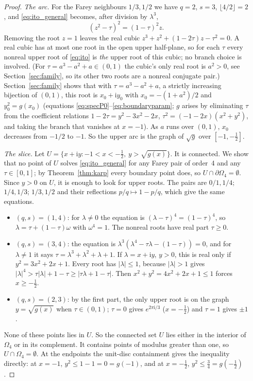 \documentclass[11pt,a4paper]{article}
\numberwithin{equation}{section}
\theoremstyle{definition}
\theoremstyle{remark}
\newcommand{\ii}{\mathrm{i}}
\newcommand{\Om}{\Omega}
\begin{document}
\begin{proof}
\emph{The arc.} For the Farey neighbours \(1/3,1/2\) we have
\(q=2\), \(s=3\), \(\lfloor4/2\rfloor=2\), and \eqref{eq:ito_general}
becomes, after division by \(\lambda^3\),
\begin{equation}
(z^2-\tau)^2=(1-\tau)^2z .
\label{eq:ito}
\end{equation}
Removing the root \(z=1\) leaves the real cubic
\(z^3+z^2+(1-2\tau)z-\tau^2=0\). A real cubic has at most one root in
the open upper half-plane, so for each \(\tau\) every nonreal upper
root of \eqref{eq:ito} is \emph{the} upper root of this cubic; no
branch choice is involved. (For \(\tau=a^3-a^2+a\in(0,1)\) the cubic's
only real root is \(a^2>0\), see Section~\ref{sec:family}, so its other
two roots are a nonreal conjugate pair.) Section~\ref{sec:family} shows that with
\(\tau=a^3-a^2+a\), a strictly increasing bijection of \((0,1)\), this
root is \(x_0+\ii y_0\) with \(x_0=-(1+a^2)/2\) and
\(y_0^2=g(x_0)\) (equations \eqref{eq:specP0}--\eqref{eq:boundaryparam};
\(g\) arises by eliminating \(\tau\) from the coefficient relations
\(1-2\tau=y^2-3x^2-2x\), \(\tau^2=(-1-2x)(x^2+y^2)\), and taking the
branch that vanishes at \(x=-1\)). As \(a\) runs over \((0,1)\), \(x_0\)
decreases from \(-1/2\) to \(-1\). So the upper arc is the graph of
\(\sqrt g\) over \([-1,-\frac12]\).

\emph{The slice.} Let \(U=\{x+\ii y:-1<x<-\frac12,\ y>\sqrt{g(x)}\}\).
It is connected. We show that no point of \(U\) solves
\eqref{eq:ito_general} for any Farey pair of order~4 and any
\(\tau\in[0,1]\); by Theorem~\ref{thm:karp} every boundary point does,
so \(U\cap\partial\Om_4=\emptyset\). Since \(y>0\) on \(U\), it is
enough to look for upper roots. The pairs are \(0/1,1/4\);
\(1/4,1/3\); \(1/3,1/2\) and their reflections \(p/q\mapsto1-p/q\),
which give the same equations.
\begin{itemize}
\item \((q,s)=(1,4)\): for \(\lambda\ne0\) the equation is
\((\lambda-\tau)^4=(1-\tau)^4\), so
\(\lambda=\tau+(1-\tau)\omega\) with \(\omega^4=1\). The nonreal roots
have real part \(\tau\ge0\).
\item \((q,s)=(3,4)\): the equation is
\(\lambda^3(\lambda^4-\tau\lambda-(1-\tau))=0\), and for \(\lambda\ne1\)
it says \(\tau=\lambda^3+\lambda^2+\lambda+1\). If
\(\lambda=x+\ii y\), \(y>0\), this is real only if
\(y^2=3x^2+2x+1\). Every root has \(|\lambda|\le1\), because
\(|\lambda|>1\) gives \(|\lambda|^4>\tau|\lambda|+1-\tau
\ge|\tau\lambda+1-\tau|\). Then
\(x^2+y^2=4x^2+2x+1\le1\) forces \(x\ge-\frac12\).
\item \((q,s)=(2,3)\): by the first part, the only upper root is on the
graph \(y=\sqrt{g(x)}\) when \(\tau\in(0,1)\); \(\tau=0\) gives
\(e^{2\pi\ii/3}\) (\(x=-\frac12\)) and \(\tau=1\) gives \(\pm1\).
\end{itemize}
None of these points lies in \(U\). So the connected set \(U\) lies
either in the interior of \(\Om_4\) or in its complement. It contains
points of modulus greater than one, so \(U\cap\Om_4=\emptyset\). At the
endpoints the unit-disc containment gives the inequality directly: at
\(x=-1\), \(y^2\le1-1=0=g(-1)\), and at \(x=-\frac12\),
\(y^2\le\frac34=g(-\frac12)\).
\end{proof}
\end{document}
